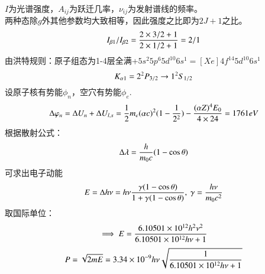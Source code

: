 \documentclass[UTF8,9pt]{ctexart}
\begin{document}
$I$为光谱强度，$A_{ij}$为跃迁几率，$\nu_{ij}$为发射谱线的频率。\\
两种态除$g$外其他参数均大致相等，因此强度之比即为$2J+1$之比。
$$I_{\beta1}/I_{\beta2}=\frac{2\times3/2+1}{2\times1/2+1}=2/1$$
由洪特规则：原子组态为1-4层全满+$5s^2 5p^6 5d^{10} 6s^1=[Xe]4f^{14} 5d^{10} 6s^1$
$$K_{\alpha1} ={2}^2P_{3/2} \rightarrow {1}^2S_{1/2}$$
设原子核有势能$\phi_n$，空穴有势能$\phi_e$.
$$\Delta \varphi_n=\Delta U_n+\Delta U_{l,s}=\frac{1}{2}m_e(\alpha c)^2(1-\frac{1}{2^2})-\frac{(\alpha Z)^4E_0}{4\times24}=1761eV$$
根据散射公式：
$$\Delta\lambda=\frac{h}{m_0c}(1-\cos\theta)$$
可求出电子动能$$E=\D h\nu=h\nu\f{\gamma(1-\cos\t)}{1+\gamma(1-\cos\t)},\ \gamma=\f{h\nu}{m_0c^2}$$
取国际单位：
$$\implies E=\frac{6.10501\times 10^{12} h^2\nu^2}{6.10501\times 10^{12} h\nu+1}$$
$$P=\sqrt{2mE}=3.34\times 10^{-9} h\nu\sqrt{\frac{1}{6.10501\times 10^{12} h\nu+1}}$$
\end{document}
